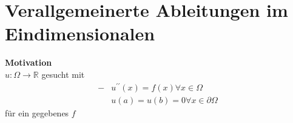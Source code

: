 \section{Verallgemeinerte Ableitungen im Eindimensionalen}

\textbf{Motivation}\\
$u\colon\Omega\to\mathbb{R}$ gesucht mit
\begin{align*}
	-&u^{\prime\prime}\left(x\right) = f\left(x\right) \forall x\in\Omega\\
	 &u\left(a\right) = u\left(b\right) = 0 \forall x\in\partial\Omega
\end{align*}
für ein gegebenes $f$


